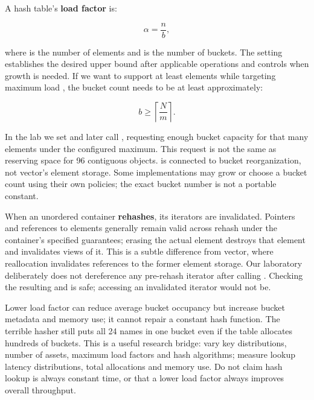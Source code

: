 \hypertarget{01-foundations-i-ch006-load-factor-controls-rehash-pressure-not-the-absence-of-collisions}{}

A hash table's \textbf{load factor} is:

\[
\alpha = \frac{n}{b},
\]

where  is the number of elements and  is the number of buckets. The  setting establishes the desired upper bound after applicable operations and controls when growth is needed. If we want to support at least  elements while targeting maximum load , the bucket count needs to be at least approximately:

\[
b \ge \left\lceil \frac{N}{m} \right\rceil.
\]

In the lab we set  and later call , requesting enough bucket capacity for that many elements under the configured maximum. This request is not the same as reserving space for 96 contiguous objects.  is connected to bucket reorganization, not vector's element storage. Some implementations may grow or choose a bucket count using their own policies; the exact bucket number is not a portable constant.

When an unordered container \textbf{rehashes}, its iterators are invalidated. Pointers and references to elements generally remain valid across rehash under the container's specified guarantees; erasing the actual element destroys that element and invalidates views of it. This is a subtle difference from vector, where reallocation invalidates references to the former element storage. Our laboratory deliberately does not dereference any pre-rehash iterator after calling . Checking the resulting  and  is safe; accessing an invalidated iterator would not be.

Lower load factor can reduce average bucket occupancy but increase bucket metadata and memory use; it cannot repair a constant hash function. The terrible hasher still puts all 24 names in one bucket even if the table allocates hundreds of buckets. This is a useful research bridge: vary key distributions, number of assets, maximum load factors and hash algorithms; measure lookup latency distributions, total allocations and memory use. Do not claim hash lookup is always constant time, or that a lower load factor always improves overall throughput.

